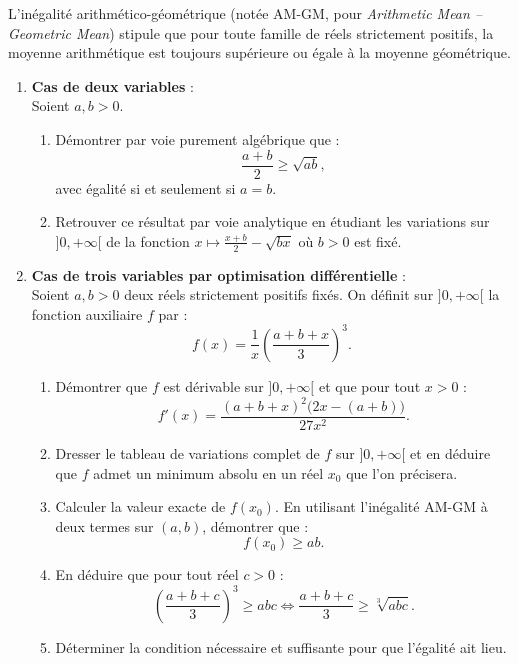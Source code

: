 \documentclass[11pt,a4paper]{article}
\begin{document}
L'inégalité arithmético-géométrique (notée AM-GM, pour \emph{Arithmetic Mean -- Geometric Mean}) stipule que pour toute famille de réels strictement positifs, la moyenne arithmétique est toujours supérieure ou égale à la moyenne géométrique.
\begin{enumerate}[label=\textbf{\arabic*.}]
    \item \textbf{Cas de deux variables} :\\
    Soient $a, b > 0$.
    \begin{enumerate}[label=\alph*.]
        \item Démontrer par voie purement algébrique que :
        \[
        \frac{a+b}{2} \ge \sqrt{ab},
        \]
        avec égalité si et seulement si $a = b$.
        \item Retrouver ce résultat par voie analytique en étudiant les variations sur $]0, +\infty[$ de la fonction $x \mapsto \frac{x+b}{2} - \sqrt{bx}$ où $b > 0$ est fixé.
    \end{enumerate}

    \item \textbf{Cas de trois variables par optimisation différentielle} :\\
    Soient $a, b > 0$ deux réels strictement positifs fixés. On définit sur $]0, +\infty[$ la fonction auxiliaire $f$ par :
    \[
    f(x) = \frac{1}{x} \left( \frac{a+b+x}{3} \right)^3.
    \]
    \begin{enumerate}[label=\alph*.]
        \item Démontrer que $f$ est dérivable sur $]0, +\infty[$ et que pour tout $x > 0$ :
        \[
        f'(x) = \frac{(a+b+x)^2 \big(2x - (a+b)\big)}{27x^2}.
        \]
        \item Dresser le tableau de variations complet de $f$ sur $]0, +\infty[$ et en déduire que $f$ admet un minimum absolu en un réel $x_0$ que l'on précisera.
        \item Calculer la valeur exacte de $f(x_0)$. En utilisant l'inégalité AM-GM à deux termes sur $(a, b)$, démontrer que :
        \[
        f(x_0) \ge ab.
        \]
        \item En déduire que pour tout réel $c > 0$ :
        \[
        \left( \frac{a+b+c}{3} \right)^3 \ge abc \iff \frac{a+b+c}{3} \ge \sqrt[3]{abc}.
        \]
        \item Déterminer la condition nécessaire et suffisante pour que l'égalité ait lieu.
    \end{enumerate}
\end{enumerate}
\end{document}

